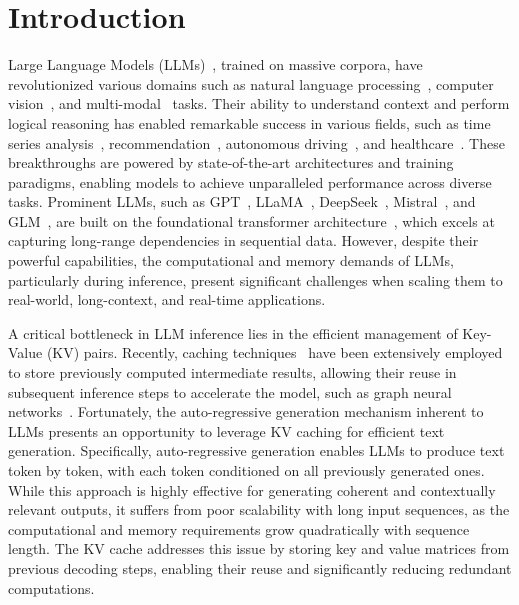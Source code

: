 \section{Introduction}
Large Language Models (LLMs)~\cite{hadi2023survey,zhu2023survey}, trained on massive corpora, have revolutionized various domains such as natural language processing~\cite{DBLP:journals/corr/abs-2307-06435, DBLP:journals/csur/MinRSVNSAHR24,xu2024large
}, computer vision~\cite{DBLP:conf/nips/LiuLWL23a,DBLP:journals/pami/ZhangHJL24,DBLP:journals/corr/abs-2306-16410}, and multi-modal~\cite{DBLP:conf/acl/ZhangY0L0C024,DBLP:conf/wacv/CuiMCYZLCLYLGLTCZLYMCWZ24, DBLP:conf/bigdataconf/WuGCWY23} tasks. 
Their ability to understand context and perform logical reasoning has enabled remarkable success in various fields, such as 
time series analysis~\cite{jin2023large,ma2024survey}, 
recommendation~\cite{tan2023user,wu2024survey},
autonomous driving~\cite{yang2023llm4drive,chen2024driving, fu2024drive},
and
healthcare~\cite{qiu2023large,zhou2023survey1}.
These breakthroughs are powered by state-of-the-art architectures and training paradigms, enabling models to achieve unparalleled performance across diverse tasks.
Prominent LLMs, such as GPT~\cite{brown2020language,radford2018improving,radford2019language},
 LLaMA~\cite{DBLP:journals/corr/abs-2302-13971, dubey2024llama},  DeepSeek~\cite{DBLP:conf/acl/DaiDZXGCLZYWXLH24,deepseek-aiDeepSeekV2StrongEconomical2024,DBLP:journals/corr/abs-2403-05525}, 
Mistral~\cite{DBLP:journals/corr/abs-2401-04088,DBLP:journals/corr/abs-2310-06825}, and GLM~\cite{DBLP:conf/iclr/ZengLDWL0YXZXTM23,DBLP:conf/acl/DuQLDQY022}, 
are built on the foundational transformer architecture~\cite{vaswani2017attention}, which excels at capturing long-range dependencies in sequential data. However, despite their powerful capabilities, the computational and memory demands of LLMs, particularly during inference, present significant challenges when scaling them to real-world, long-context, and real-time applications.

A critical bottleneck in LLM inference lies in the efficient management of Key-Value (KV) pairs. 
Recently, caching techniques~\cite{gracioli2015survey,podlipnig2003survey} 
have been extensively employed to store previously computed intermediate results, allowing their reuse in subsequent inference steps to accelerate the model, such as graph neural networks~\cite{DBLP:conf/cikm/LiC21, DBLP:journals/pacmmod/LiSCY23,lin2020pagraph}.
Fortunately, the auto-regressive generation mechanism inherent to LLMs presents an opportunity to leverage KV caching for efficient text generation. 
Specifically,
auto-regressive generation enables LLMs to produce text token by token, with each token conditioned on all previously generated ones. While this approach is highly effective for generating coherent and contextually relevant outputs, it suffers from poor scalability with long input sequences, as the computational and memory requirements grow quadratically with sequence length. The KV cache addresses this issue by storing key and value matrices from previous decoding steps, enabling their reuse and significantly reducing redundant computations. 



